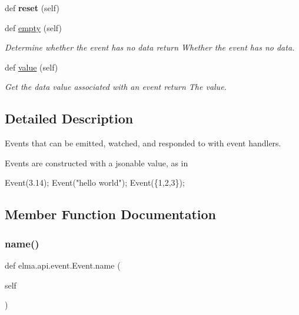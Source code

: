 \begin{DoxyCompactItemize}
def {\bfseries reset} (self)
\item 
\mbox{\label{classelma_1_1api_1_1event_1_1Event_a31067ddfc1b3a5584799255db0405efb}} 
def \hyperlink{classelma_1_1api_1_1event_1_1Event_a31067ddfc1b3a5584799255db0405efb}{empty} (self)
\begin{DoxyCompactList}\small\item\em Determine whether the event has no data return Whether the event has no data. \end{DoxyCompactList}\item 
\mbox{\label{classelma_1_1api_1_1event_1_1Event_a26e3c222b0421cd70d66041466e0b189}} 
def \hyperlink{classelma_1_1api_1_1event_1_1Event_a26e3c222b0421cd70d66041466e0b189}{value} (self)
\begin{DoxyCompactList}\small\item\em Get the data value associated with an event return The value. \end{DoxyCompactList}\end{DoxyCompactItemize}


\subsection{Detailed Description}
Events that can be emitted, watched, and responded to with event handlers. 

Events are constructed with a jsonable value, as in 
\begin{DoxyCode}
Event(3.14);
Event(\textcolor{stringliteral}{"hello world"});
Event(\{1,2,3\});
\end{DoxyCode}
 

\subsection{Member Function Documentation}
\mbox{\label{classelma_1_1api_1_1event_1_1Event_aff9b51b4633b58b32e4cb04d9fca568d}} 
\subsubsection{\texorpdfstring{name()}{name()}}
{\footnotesize\ttfamily def elma.\+api.\+event.\+Event.\+name (\begin{DoxyParamCaption}\item[{}]{self }\end{DoxyParamCaption})}



